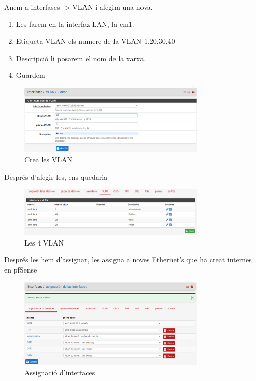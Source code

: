 \documentclass[
  10pt,
]{krantz}
\providecommand{\tightlist}{%
  \setlength{\itemsep}{0pt}\setlength{\parskip}{0pt}}
\begin{document}
Anem a interfases -\textgreater{} VLAN i afegim una nova.

\begin{enumerate}
\def\labelenumi{\arabic{enumi}.}
\tightlist
\item
  Les farem en la interfaz LAN, la em1.\\
\item
  Etiqueta VLAN els numere de la VLAN 1,20,30,40
\item
  Descripció li posarem el nom de la xarxa.
\item
  Guardem
\end{enumerate}

\begin{figure}
\centering
\includegraphics[width=0.8\textwidth,height=\textheight]{imatges/proxmox/VLAN_crea.png}
\caption{Crea les VLAN}
\end{figure}

Després d'afegir-les, ens quedaria

\begin{figure}
\centering
\includegraphics[width=0.8\textwidth,height=\textheight]{imatges/proxmox/vlan_les4.png}
\caption{Les 4 VLAN}
\end{figure}

Després les hem d'assignar, les assigna a noves Ethernet's que ha creat internes en pfSense

\begin{figure}
\centering
\includegraphics[width=0.8\textwidth,height=\textheight]{imatges/proxmox/vlan_asigna.png}
\caption{Assignació d'interfaces}
\end{figure}
\end{document}
